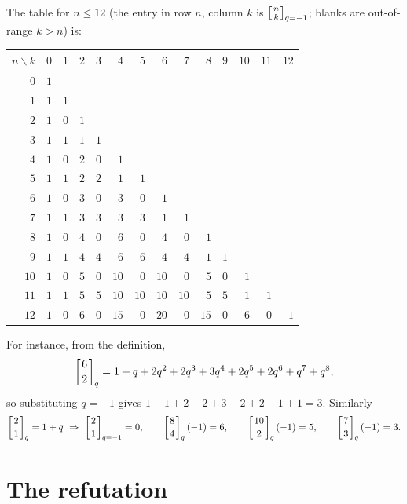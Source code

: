 \documentclass[11pt]{article}
\theoremstyle{definition}
\theoremstyle{remark}
\newcommand{\qbin}[2]{\left[\genfrac{}{}{0pt}{}{#1}{#2}\right]_{q}}
\newcommand{\qbinm}[2]{\left[\genfrac{}{}{0pt}{}{#1}{#2}\right]_{q=-1}}
\begin{document}
The table for $n \le 12$ (the entry in row $n$, column $k$ is
$\qbinm{n}{k}$; blanks are out-of-range $k>n$) is:

\begin{center}
\small
\begin{tabular}{r|r r r r r r r r r r r r r}
\toprule
$n\backslash k$ & $0$ & $1$ & $2$ & $3$ & $4$ & $5$ & $6$ & $7$ & $8$ & $9$ & $10$ & $11$ & $12$\\
\midrule
$0$  & $1$ &   &   &   &   &   &   &   &   &   &    &    &   \\
$1$  & $1$ & $1$ &   &   &   &   &   &   &   &   &    &    &   \\
$2$  & $1$ & $0$ & $1$ &   &   &   &   &   &   &   &    &    &   \\
$3$  & $1$ & $1$ & $1$ & $1$ &   &   &   &   &   &   &    &    &   \\
$4$  & $1$ & $0$ & $2$ & $0$ & $1$ &   &   &   &   &   &    &    &   \\
$5$  & $1$ & $1$ & $2$ & $2$ & $1$ & $1$ &   &   &   &   &    &    &   \\
$6$  & $1$ & $0$ & $3$ & $0$ & $3$ & $0$ & $1$ &   &   &   &    &    &   \\
$7$  & $1$ & $1$ & $3$ & $3$ & $3$ & $3$ & $1$ & $1$ &   &   &    &    &   \\
$8$  & $1$ & $0$ & $4$ & $0$ & $6$ & $0$ & $4$ & $0$ & $1$ &   &    &    &   \\
$9$  & $1$ & $1$ & $4$ & $4$ & $6$ & $6$ & $4$ & $4$ & $1$ & $1$ &    &    &   \\
$10$ & $1$ & $0$ & $5$ & $0$ & $10$ & $0$ & $10$ & $0$ & $5$ & $0$ & $1$ &    &   \\
$11$ & $1$ & $1$ & $5$ & $5$ & $10$ & $10$ & $10$ & $10$ & $5$ & $5$ & $1$ & $1$ &   \\
$12$ & $1$ & $0$ & $6$ & $0$ & $15$ & $0$ & $20$ & $0$ & $15$ & $0$ & $6$ & $0$ & $1$\\
\bottomrule
\end{tabular}
\end{center}

For instance, from the definition,
\[
\qbin{6}{2} = 1+q+2q^{2}+2q^{3}+3q^{4}+2q^{5}+2q^{6}+q^{7}+q^{8},
\]
so substituting $q=-1$ gives $1-1+2-2+3-2+2-1+1 = 3$. Similarly
\[
\qbin{2}{1} = 1+q \ \Rightarrow\ \qbinm{2}{1}=0,
\qquad
\qbin{8}{4}(-1) = 6,
\qquad
\qbin{10}{2}(-1) = 5,
\qquad
\qbin{7}{3}(-1) = 3 .
\]

\section{The refutation}
\end{document}
